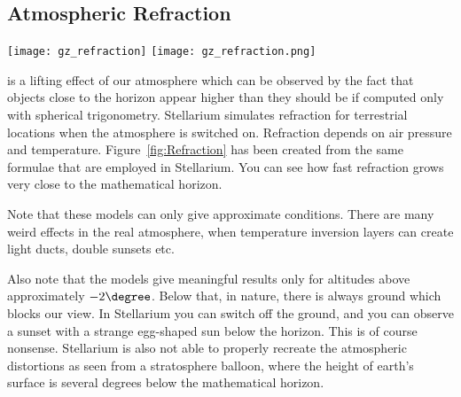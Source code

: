 \subsection{Atmospheric Refraction}
\label{sec:phenomena:Refraction}


\begin{sidewaysfigure}%
\centering
\ifpdf
\texttt{[image: gz\_refraction]}
\else
\texttt{[image: gz\_refraction.png]}
\fi
\caption{Refraction. The figure shows corrective values (degrees)
  which are subtracted from observed altitudes (left side) to reach
  geometric altitudes, or values to be added to computed values (right
  side). The models used are not directly inverse operations.}
\label{fig:Refraction}
\end{sidewaysfigure}


 is a lifting effect of our
atmosphere which can be observed by the fact that objects close to the
horizon appear higher than they should be if computed only with
spherical trigonometry. Stellarium simulates refraction for
terrestrial locations when the atmosphere is switched on. Refraction
depends on air pressure and temperature. Figure~\ref{fig:Refraction}
has been created from the same formulae that are employed in
Stellarium. You can see how fast refraction grows very close to the
mathematical horizon.

Note that these models can only give approximate conditions. There are
many weird effects in the real atmosphere, when temperature inversion
layers can create light ducts, double sunsets etc.

Also note that the models give meaningful results only for altitudes
above approximately $-2\degree$. Below that, in nature, there is
always ground which blocks our view. In Stellarium you can switch off
the ground, and you can observe a sunset with a strange egg-shaped sun
below the horizon. This is of course nonsense. Stellarium is also not
able to properly recreate the atmospheric distortions as seen from a
stratosphere balloon, where the height of earth's surface is several
degrees below the mathematical horizon.

